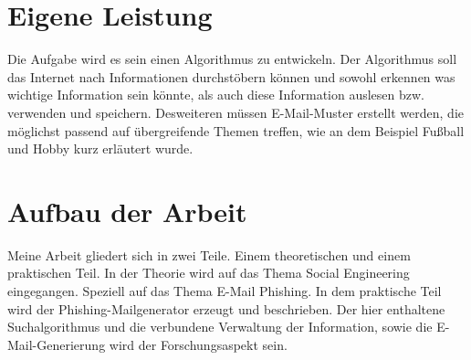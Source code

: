 \section{Eigene Leistung}
\label {sec:Leistung} 
Die Aufgabe wird es sein einen Algorithmus zu entwickeln. Der Algorithmus soll das Internet nach Informationen durchstöbern können und sowohl erkennen was wichtige Information sein könnte, als auch diese Information auslesen bzw. verwenden und speichern. Desweiteren müssen E-Mail-Muster erstellt werden, die möglichst passend auf übergreifende Themen treffen, wie an dem Beispiel Fußball und Hobby kurz erläutert wurde.

\section{Aufbau der Arbeit}
\label {sec:Aufbau} 
Meine Arbeit gliedert sich in zwei Teile. Einem theoretischen und einem praktischen Teil. In der Theorie wird auf das Thema Social Engineering eingegangen. Speziell auf das Thema E-Mail Phishing. In dem praktische Teil wird der Phishing-Mailgenerator erzeugt und beschrieben. Der hier enthaltene Suchalgorithmus und die verbundene Verwaltung der Information, sowie die E-Mail-Generierung wird der Forschungsaspekt sein.


